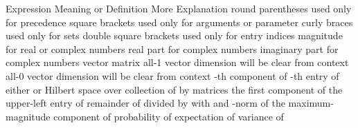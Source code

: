 \starttitle [title={Notation}]

\starttable[|l|l|l|] \HL
\NC Expression \VL Meaning or Definition \VL More Explanation \SR \HL
\NC {} \VL round parentheses \VL used only for precedence \AR \HL
\NC {} \VL square brackets \VL used only for arguments or parameter \AR \HL
\NC {} \VL curly braces \VL used only for sets \AR \HL
\NC {} \VL double square brackets \VL used only for entry indices \AR \HL
\NC {} \VL magnitude \VL for real or complex numbers \AR \HL
\NC {} \VL real part \VL for complex numbers \AR \HL
\NC {} \VL imaginary part \VL for complex numbers \AR \HL
\NC {} \VL vector \VL \AR \HL
\NC {} \VL matrix \VL \AR \HL
\NC {} \VL all-1 vector \VL dimension will be clear from context \AR \HL
\NC {} \VL all-0 vector \VL dimension will be clear from context \AR \HL
\NC {} \VL {}-th component of  \VL \AR \HL
\NC {} \VL {}-th entry of  \VL \AR \HL
\NC {} \VL either  or  \VL  \AR \HL
\NC {} \VL Hilbert space  over  \VL  \AR \HL
\NC {} \VL collection of  by  matrices \VL  \AR \HL
\NC {} \VL the first component of  \VL  \AR \HL
\NC {} \VL the upper-left entry of  \VL  \AR \HL
\NC {} \VL remainder of  divided by  \VL with  and  \AR \HL
\NC {} \VL {}-norm of  \VL {} \AR \HL
\NC {} \VL the maximum-magnitude \VL  \AR
\NC  \VL component of  \VL  \AR \HL
\NC {} \VL probability of  \VL  \AR \HL
\NC {} \VL expectation of  \VL  \AR \HL
\NC {} \VL variance of  \VL  \AR \HL
\stoptable

\stopchapter
